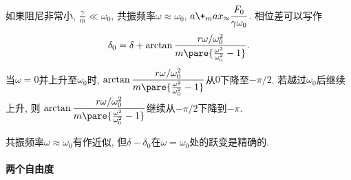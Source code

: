 \documentclass[../LectureNotes.tex]{subfiles}
\begin{document}
如果阻尼非常小, $\displaystyle \frac{\gamma}{m} \ll \omega_0$, 共振频率$\omega \approx \omega_0$, $\displaystyle a\+_max_ \approx \frac{F_0}{\gamma \omega_0}$.
相位差可以写作
\[ \delta_0 = \delta + \arctan \frac{r\omega/\omega_0^2}{m\pare{\frac{\omega^2}{\omega_0^2} -1}}. \]
当$\omega = 0$并上升至$\omega_0$时, $\displaystyle \arctan \frac{r\omega/\omega_0^2}{m\pare{\frac{\omega^2}{\omega_0^2} -1}}$从$0$下降至$-\pi/2$. 若越过$\omega_0$后继续上升, 则
$\displaystyle \arctan \frac{r\omega/\omega_0^2}{m\pare{\frac{\omega^2}{\omega_0^2} -1}}$继续从$-\pi/2$下降到$-\pi$.
\begin{pitfall}
    共振频率$\omega \approx \omega_0$有作近似, 但$\delta - \delta_0$在$\omega = \omega_0$处的跃变是精确的.
\end{pitfall}


\paragraph{两个自由度} %
\label{par:两个自由度}
\end{document}
